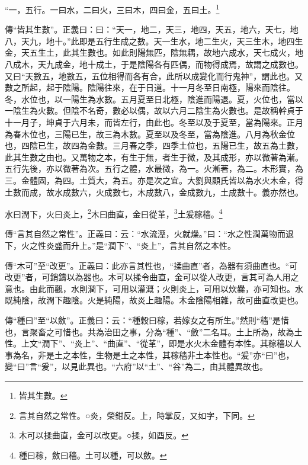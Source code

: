 “一，五行。一曰水，二曰火，三曰木，四曰金，五曰土。\footnote{皆其生數。}


{\noindent\zhuan{}\fzbyks 傳“皆其生數”。正義曰：曰：“天一，地二，天三，地四，天五，地六，天七，地八，天九，地十。”此即是五行生成之數。天一生水，地二生火，天三生木，地四生金，天五生土，此其生數也。如此則陽無匹，陰無耦，故地六成水，天七成火，地八成木，天九成金，地十成土，于是陰陽各有匹偶，而物得成焉，故謂之成數也。又曰“天數五，地數五，五位相得而各有合，此所以成變化而行鬼神”，謂此也。又數之所起，起于陰陽。陰陽往來，在于日道。十一月冬至日南極，陽來而陰往。冬，水位也，以一陽生為水數。五月夏至日北極，陰進而陽退。夏，火位也，當以一陰生為火數。但陰不名奇，數必以偶，故以六月二陰生為火數也。是故稱幹貞于十一月子，坤貞于六月未，而皆左行，由此也。冬至以及于夏至，當為陽來。正月為春木位也，三陽已生，故三為木數。夏至以及冬至，當為陰進。八月為秋金位也，四陰已生，故四為金數。三月春之季，四季土位也，五陽已生，故五為土數，此其生數之由也。又萬物之本，有生于無，者生于微，及其成形，亦以微著為漸。五行先後，亦以微著為次。五行之體，水最微，為一。火漸著，為二。木形實，為三。金體固，為四。土質大，為五。亦是次之宜。大劉與顧氏皆以為水火木金，得土數而成，故水成數六，火成數七，木成數八，金成數九，土成數十。義亦然也。 \par}

水曰潤下，火曰炎上，\footnote{言其自然之常性。○炎，榮鉗反。上，時掌反，又如字，下同。}木曰曲直，金曰從革，\footnote{木可以揉曲直，金可以改更。○揉，如酉反。}土爰稼穡。\footnote{種曰稼，斂曰穡。土可以種，可以斂。}


{\noindent\zhuan{}\fzbyks 傳“言其自然之常性”。正義曰：云：“水流溼，火就燥。”曰：“水之性潤萬物而退下，火之性炎盛而升上。”是“潤下”、“炎上”，言其自然之本性。 \par}

{\noindent\zhuan{}\fzbyks 傳“木可”至“改更”。正義曰：此亦言其性也，“揉曲直”者，為器有須曲直也。“可改更”者，可銷鑄以為器也。木可以揉令曲直，金可以從人改更，言其可為人用之意也。由此而觀，水則潤下，可用以灌溉；火則炎上，可用以炊爨，亦可知也。水既純陰，故潤下趣陰。火是純陽，故炎上趣陽。木金陰陽相雜，故可曲直改更也。 \par}

{\noindent\zhuan{}\fzbyks 傳“種曰”至“以斂”。正義曰：云：“種穀曰稼，若嫁女之有所生。”然則“穡”是惜也，言聚畜之可惜也。共為治田之事，分為“種”、“斂”二名耳。土上所為，故為土性。上文“潤下”、“炎上”、“曲直”、“從革”，即是水火木金體有本性。其稼穡以人事為名，非是土之本性，生物是土之本性，其稼穡非土本性也。“爰”亦“曰”也，變“曰”言“爰”，以見此異也。“六府”以“土”、“谷”為二，由其體異故也。 \par}

